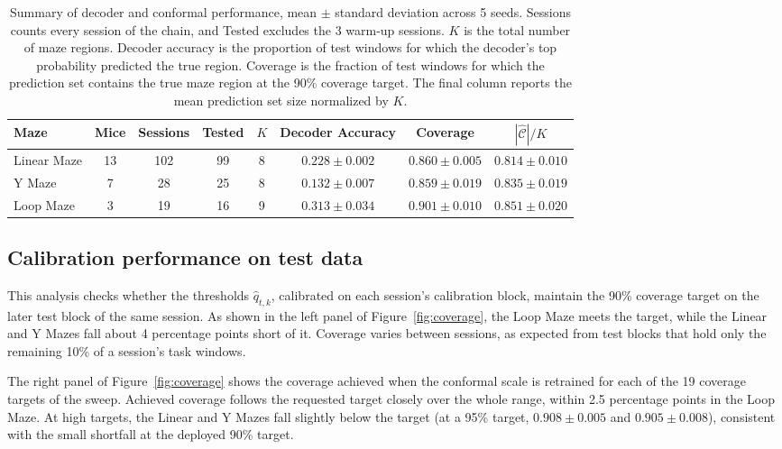 \documentclass{article}
\begin{document}
\begin{table}[!ht]
  \caption{Summary of decoder and conformal performance, mean $\pm$ standard deviation across 5 seeds. Sessions counts every session of the chain, and Tested excludes the 3 warm-up sessions. $K$ is the total number of maze regions. Decoder accuracy is the proportion of test windows for which the decoder's top probability predicted the true region. Coverage is the fraction of test windows for which the prediction set contains the true maze region at the 90\% coverage target. The final column reports the mean prediction set size normalized by $K$.}
  \label{tab:results}
  \centering
  \footnotesize
  \begin{tabular}{@{}l *{7}{c}@{}}
    \toprule
    Maze & Mice & Sessions & Tested & $K$ & Decoder Accuracy
         & Coverage & $|\widehat{\mathcal{C}}|/K$ \\
    \midrule
    Linear Maze & 13 & 102 & 99 & 8 & $0.228\pm0.002$ & $0.860\pm0.005$ & $0.814\pm0.010$ \\
    Y Maze      & 7  & 28  & 25 & 8 & $0.132\pm0.007$ & $0.859\pm0.019$ & $0.835\pm0.019$ \\
    Loop Maze   & 3  & 19  & 16 & 9 & $0.313\pm0.034$ & $0.901\pm0.010$ & $0.851\pm0.020$ \\
    \bottomrule
  \end{tabular}
\end{table}

\FloatBarrier
\subsection{Calibration performance on test data}
This analysis checks whether the thresholds $\hat q_{t,k}$, calibrated on each session's calibration block, maintain the 90\% coverage target on the later test block of the same session. As shown in the left panel of Figure~\ref{fig:coverage}, the Loop Maze meets the target, while the Linear and Y Mazes fall about 4 percentage points short of it. Coverage varies between sessions, as expected from test blocks that hold only the remaining 10\% of a session's task windows.

The right panel of Figure~\ref{fig:coverage} shows the coverage achieved when the conformal scale is retrained for each of the 19 coverage targets of the sweep. Achieved coverage follows the requested target closely over the whole range, within 2.5 percentage points in the Loop Maze. At high targets, the Linear and Y Mazes fall slightly below the target (at a 95\% target, $0.908\pm0.005$ and $0.905\pm0.008$), consistent with the small shortfall at the deployed 90\% target.
\end{document}
